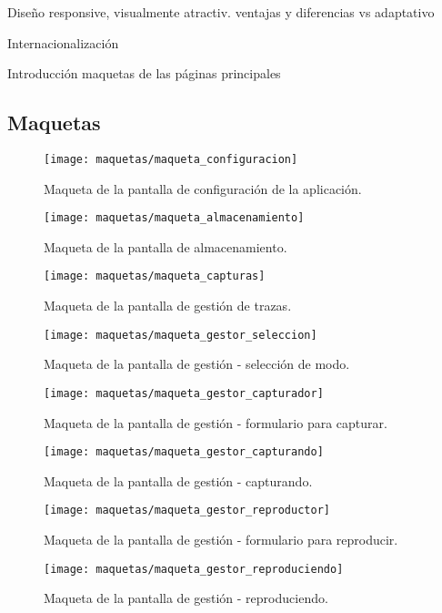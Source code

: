 Diseño responsive, visualmente atractiv. ventajas y diferencias vs adaptativo

Internacionalización

Introducción maquetas de las páginas principales

\subsection{Maquetas\label{ssec:dis:maquetas}}

\begin{figure}[!htp]
  \centering
  \texttt{[image: maquetas/maqueta\_configuracion]}
  \caption{Maqueta de la pantalla de configuración de la aplicación.}
  \label{fig:maqueta:configuracion}
\end{figure}

\begin{figure}[!htp]
  \centering
  \texttt{[image: maquetas/maqueta\_almacenamiento]}
  \caption{Maqueta de la pantalla de almacenamiento.}
  \label{fig:maqueta:almacenamiento}
\end{figure}

\begin{figure}[!htp]
  \centering
  \texttt{[image: maquetas/maqueta\_capturas]}
  \caption{Maqueta de la pantalla de gestión de \glspl{traza}.}
  \label{fig:maqueta:capturas}
\end{figure}

\begin{figure}[!htp]
  \centering
  \texttt{[image: maquetas/maqueta\_gestor\_seleccion]}
  \caption{Maqueta de la pantalla de gestión - selección de modo.}
  \label{fig:maqueta:gestor_seleccion}
\end{figure}

\begin{figure}[!htp]
  \centering
  \texttt{[image: maquetas/maqueta\_gestor\_capturador]}
  \caption{Maqueta de la pantalla de gestión - formulario para capturar.}
  \label{fig:maqueta:gestor_capturador}
\end{figure}

\begin{figure}[!htp]
  \centering
  \texttt{[image: maquetas/maqueta\_gestor\_capturando]}
  \caption{Maqueta de la pantalla de gestión - capturando.}
  \label{fig:maqueta:gestor_capturando}
\end{figure}

\begin{figure}[!htp]
  \centering
  \texttt{[image: maquetas/maqueta\_gestor\_reproductor]}
  \caption{Maqueta de la pantalla de gestión - formulario para reproducir.}
  \label{fig:maqueta:gestor_reproductor}
\end{figure}

\begin{figure}[!htp]
  \centering
  \texttt{[image: maquetas/maqueta\_gestor\_reproduciendo]}
  \caption{Maqueta de la pantalla de gestión - reproduciendo.}
  \label{fig:maqueta:gestor_reproduciendo}
\end{figure}